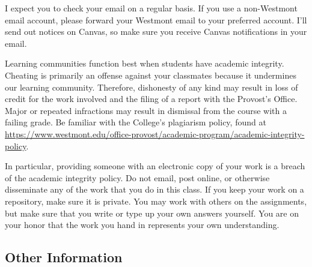 \documentclass[
  twoside]{article}
\begin{document}
I expect you to check your email on a regular basis. If you use a
non-Westmont email account, please forward your Westmont email to your
preferred account. I'll send out notices on Canvas, so make sure you
receive Canvas notifications in your email.

Learning communities function best when students have academic
integrity. Cheating is primarily an offense against your classmates
because it undermines our learning community. Therefore, dishonesty of
any kind may result in loss of credit for the work involved and the
filing of a report with the Provost's Office. Major or repeated
infractions may result in dismissal from the course with a failing
grade. Be familiar with the College's plagiarism policy, found at
\url{https://www.westmont.edu/office-provost/academic-program/academic-integrity-policy}.

In particular, providing someone with an electronic copy of your work is
a breach of the academic integrity policy. Do not email, post online, or
otherwise disseminate any of the work that you do in this class. If you
keep your work on a repository, make sure it is private. You may work
with others on the assignments, but make sure that you write or type up
your own answers yourself. You are on your honor that the work you hand
in represents your own understanding.

\clearpage

\hypertarget{other-information}{%
\subsection{Other Information}\label{other-information}}
\end{document}
